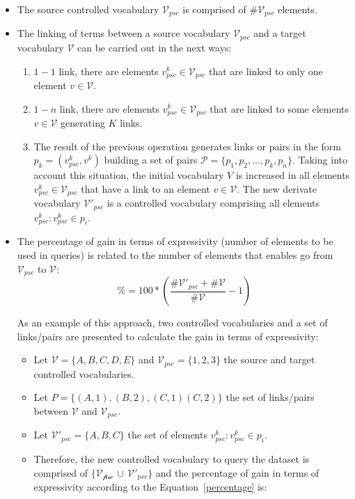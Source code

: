 \begin{itemize}
 \item The source controlled vocabulary $\mathcal{V}_{psc}$ is comprised of \#$\mathcal{V}_{psc}$ elements.
 \item The linking of terms between a source vocabulary $\mathcal{V}_{psc}$ and  a target vocabulary $\mathcal{V}$ can be carried out in the next ways:
 \begin{enumerate}
  \item $1-1$ link, there are elements $v^k_{psc} \in \mathcal{V}_{psc}$ that are linked to only one element $v \in \mathcal{V}$.
  \item $1-n$ link, there are elements $v^k_{psc} \in \mathcal{V}_{psc}$ that are linked to some elements $v \in \mathcal{V}$ generating $K$ links.  
  \item The result of the previous operation generates links or pairs in the form $p_k=(v^k_{psc}, v^k)$ building a set of pairs $\mathcal{P}=\{p_1,p_2,...,p_k,p_n\}$. Taking into account this situation, 
  the initial vocabulary $V$ is increased in all elements $v^k_{psc} \in \mathcal{V}_{psc}$ that have a link to an element $v \in \mathcal{V}$. The new 
  derivate vocabulary $\mathcal{V'}_{psc}$ is a controlled vocabulary comprising all elements $v^k_{psc}: v^k_{psc} \in p_i$.
 \end{enumerate}
 
 \item The percentage of gain in terms of expressivity (number of elements to be used in queries) is related to the number of elements that enables go from $\mathcal{V}_{psc}$ to $\mathcal{V}$:	
 \begin{equation}\label{percentage}
  \%=100*(\frac{\#\mathcal{V'}_{psc} + \#\mathcal{V}}{\#\mathcal{V}}-1)
 \end{equation}
 
  As an example of this approach, two controlled vocabularies and a set of links/pairs are presented to calculate the gain in terms of expressivity:
  \begin{itemize}
  \item Let $\mathcal{V} = \{A, B, C, D, E\}$  and  $\mathcal{V}_{psc} = \{1, 2, 3\}$ the source and target controlled vocabularies.
  \item Let $P = \{ (A,1), (B,2), (C,1) (C,2) \}$ the set of links/pairs between $\mathcal{V}$ and $\mathcal{V}_{psc}$.
  \item Let $\mathcal{V'}_{psc} = \{ A, B, C \}$ the set of elements $v^k_{psc}: v^k_{psc} \in p_i$.
  \item Therefore, the new controlled vocabulary to query the dataset is comprised of $\{\mathcal{V_{psc}}\,\cup\,\mathcal{V'}_{psc}\}$ and the percentage of gain in terms of expressivity 
  according to the Equation~\ref{percentage} is:


\end{itemize}
\end{itemize}

